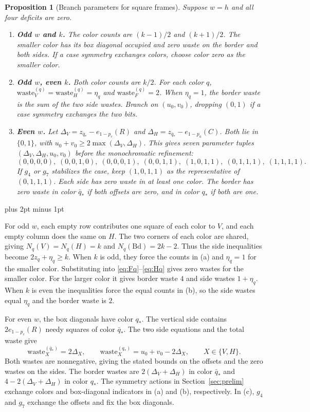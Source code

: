 \documentclass[11pt,a4paper]{article}
\makeatletter
\renewenvironment{proof}[1][\proofname]{%
  \par\pushQED{\qed}\normalfont
  \topsep8pt plus 2pt minus 1pt\relax
  \trivlist\item[\hskip\labelsep\itshape #1\@addpunct{.}]\ignorespaces
}{\popQED\endtrivlist\@endpefalse}
\theoremstyle{result}
\newtheorem{proposition}[theorem]{Proposition}
\theoremstyle{definition}
\theoremstyle{remark}
\newcommand{\waste}{\mathrm{waste}}
\newcommand{\Bd}{\mathrm{Bd}}
\makeatother
\begin{document}
\begin{proposition}[Branch parameters for square frames]\label{prop:sq0}
Suppose $w=h$ and all four deficits are zero.
\begin{enumerate}[label=(\alph*),leftmargin=2em,itemsep=3pt]
  \item \textbf{Odd $w$ and $k$.}
    The color counts are $(k-1)/2$ and $(k+1)/2$. The smaller
    color has its box diagonal occupied and zero waste on the
    border and both sides. If a case symmetry exchanges colors,
    choose color zero as the smaller color.
  \item \textbf{Odd $w$, even $k$.}
    Both color counts are $k/2$. For each color $q$,
    $\waste_V^{(q)}=\waste_H^{(q)}=\eta_q$ and
    $\waste_F^{(q)}=2$. When $\eta_q=1$, the border waste is
    the sum of the two side wastes. Branch on $(u_0,v_0)$,
    dropping $(0,1)$ if a case symmetry exchanges the two bits.
  \item \textbf{Even $w$.}
    Let $\Delta_V=z_{\bar q_*}-e_{1-p_c}(R)$ and
    $\Delta_H=z_{\bar q_*}-e_{1-p_a}(C)$. Both lie in $\{0,1\}$,
    with $u_0+v_0\ge2\max(\Delta_V,\Delta_H)$. This gives seven
    parameter tuples $(\Delta_V,\Delta_H,u_0,v_0)$ before the
    monochromatic refinement:
  \[
    (0,0,0,0),\; (0,0,1,0),\; (0,0,0,1),\; (0,0,1,1),\; (1,0,1,1),\; (0,1,1,1),\; (1,1,1,1).
  \]
    If $g_4$ or $g_7$ stabilizes the case, keep $(1,0,1,1)$
    as the representative of $(0,1,1,1)$. Each side has
    zero waste in at least one color. The border has zero
    waste in color $\bar q_*$ if both offsets are zero,
    and in color $q_*$ if both are one.
\end{enumerate}
\end{proposition}

\begin{proof}
For odd $w$, each empty row contributes one square of each color
to $V$, and each empty column does the same on $H$. The two corners
of each color are shared, giving $N_q(V)=N_q(H)=k$ and
$N_q(\Bd)=2k-2$. Thus the side inequalities become
$2z_q+\eta_q\ge k$. When $k$ is odd, they force the counts in (a)
and $\eta_q=1$ for the smaller color. Substituting into
\eqref{eq:Fq}--\eqref{eq:Hq} gives zero wastes for the smaller
color. For the larger color it gives border waste $4$ and side
wastes $1+\eta_q$. When $k$ is even the inequalities force the
equal counts in (b), so the side wastes equal $\eta_q$ and the
border waste is $2$.

For even $w$, the box diagonals have color $q_*$. The vertical
side contains $2e_{1-p_c}(R)$ needy squares of color $\bar q_*$.
The two side equations and the total waste give
\[
  \waste_X^{(\bar q_*)}=2\Delta_X,\qquad
  \waste_X^{(q_*)}=u_0+v_0-2\Delta_X,\qquad X\in\{V,H\}.
\]
Both wastes are nonnegative, giving the stated bounds on the
offsets and the zero wastes on the sides. The border wastes are
$2(\Delta_V+\Delta_H)$ in color $\bar q_*$ and
$4-2(\Delta_V+\Delta_H)$ in color $q_*$.
The symmetry actions in Section~\ref{sec:prelim} exchange colors
and box-diagonal indicators in (a) and (b), respectively.
In (c), $g_4$ and $g_7$ exchange the offsets and fix the box diagonals.
\end{proof}
\end{document}
